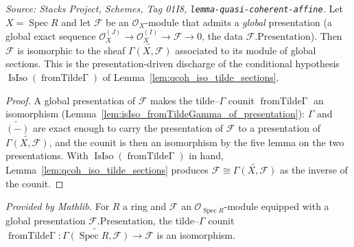 \begin{lemma}

  \label{lem:qcoh_iso_tilde_sections_of_presentation}
  \textit{Source: Stacks Project, Schemes, Tag 01I8, \texttt{lemma-quasi-coherent-affine}.}
  Let \(X = \operatorname{Spec} R\) and let \(\mathcal{F}\) be an \(\mathcal{O}_X\)-module that admits
  a \emph{global} presentation (a global exact sequence
  \(\mathcal{O}_X^{(J)} \to \mathcal{O}_X^{(I)} \to \mathcal{F} \to 0\), the data
  \(\mathcal{F}.\mathrm{Presentation}\)). Then \(\mathcal{F}\) is isomorphic to the sheaf
  \(\widetilde{\Gamma(X, \mathcal{F})}\) associated to its module of global sections. This is the
  presentation-driven discharge of the conditional hypothesis
  \(\operatorname{IsIso}(\operatorname{fromTilde\Gamma})\) of Lemma~\ref{lem:qcoh_iso_tilde_sections}.
\end{lemma}
\begin{proof}
  \leanok
  A global presentation of \(\mathcal{F}\) makes the tilde–\(\Gamma\) counit
  \(\operatorname{fromTilde\Gamma}\) an isomorphism
  (Lemma~\ref{lem:isIso_fromTildeGamma_of_presentation}): \(\Gamma\) and \(\widetilde{(-)}\) are exact
  enough to carry the presentation of \(\mathcal{F}\) to a presentation of
  \(\widetilde{\Gamma(X, \mathcal{F})}\), and the counit is then an isomorphism by the five lemma on
  the two presentations. With \(\operatorname{IsIso}(\operatorname{fromTilde\Gamma})\) in hand,
  Lemma~\ref{lem:qcoh_iso_tilde_sections} produces \(\mathcal{F} \cong \widetilde{\Gamma(X,
  \mathcal{F})}\) as the inverse of the counit.
\end{proof}

\begin{lemma}
  \label{lem:isIso_fromTildeGamma_of_presentation}
  \mathlibok
  \textit{Provided by Mathlib.}
  For \(R\) a ring and \(\mathcal{F}\) an \(\mathcal{O}_{\operatorname{Spec} R}\)-module equipped with
  a global presentation \(\mathcal{F}.\mathrm{Presentation}\), the tilde–\(\Gamma\) counit
  \(\operatorname{fromTilde\Gamma} : \widetilde{\Gamma(\operatorname{Spec} R, \mathcal{F})} \to
  \mathcal{F}\) is an isomorphism.
\end{lemma}

